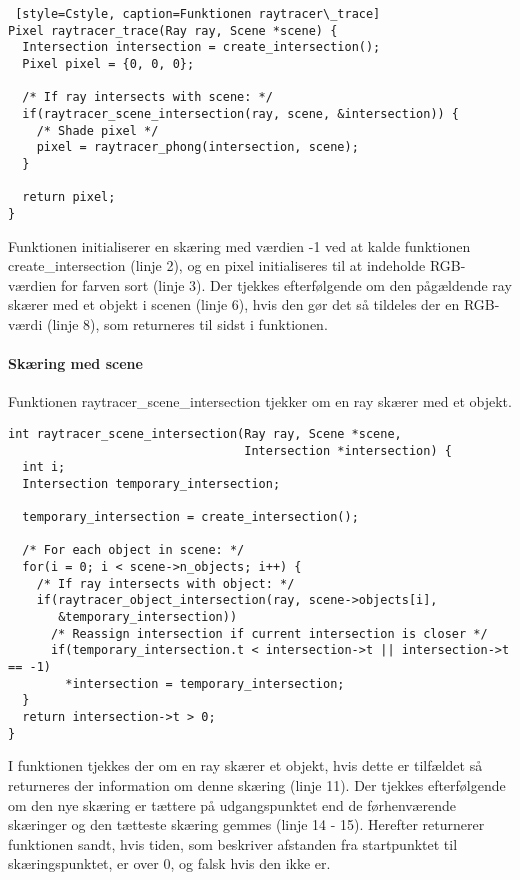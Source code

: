 \begin{lstlisting} [style=Cstyle, caption=Funktionen raytracer\_trace]
Pixel raytracer_trace(Ray ray, Scene *scene) {
  Intersection intersection = create_intersection();
  Pixel pixel = {0, 0, 0};
  
  /* If ray intersects with scene: */
  if(raytracer_scene_intersection(ray, scene, &intersection)) {
    /* Shade pixel */
    pixel = raytracer_phong(intersection, scene);
  }
  
  return pixel;
}
\end{lstlisting}
Funktionen initialiserer en skæring med værdien -1 ved at kalde funktionen create\_intersection (linje 2), og en pixel initialiseres til at indeholde RGB-værdien for farven sort (linje 3). Der tjekkes efterfølgende om den pågældende ray skærer med et objekt i scenen (linje 6), hvis den gør det så tildeles der en RGB-værdi (linje 8), som returneres til sidst i funktionen. 

\paragraph{Skæring med scene}

Funktionen raytracer\_scene\_intersection tjekker om en ray skærer med et objekt.

\begin{lstlisting}[style=Cstyle, caption=Funktionen raytracer\_scene\_intersection]
int raytracer_scene_intersection(Ray ray, Scene *scene, 
                                 Intersection *intersection) {
  int i;
  Intersection temporary_intersection;

  temporary_intersection = create_intersection();

  /* For each object in scene: */
  for(i = 0; i < scene->n_objects; i++) {
    /* If ray intersects with object: */
    if(raytracer_object_intersection(ray, scene->objects[i], 
       &temporary_intersection))
      /* Reassign intersection if current intersection is closer */
      if(temporary_intersection.t < intersection->t || intersection->t == -1)
        *intersection = temporary_intersection;
  }
  return intersection->t > 0;
}
\end{lstlisting}

I funktionen tjekkes der om en ray skærer et objekt, hvis dette er tilfældet så returneres der information om denne skæring (linje 11). Der tjekkes efterfølgende om den nye skæring er tættere på udgangspunktet end de førhenværende skæringer og den tætteste skæring gemmes (linje 14 - 15). Herefter returnerer funktionen sandt, hvis tiden, som beskriver afstanden fra startpunktet  til skæringspunktet, er over 0, og falsk hvis den ikke er.


